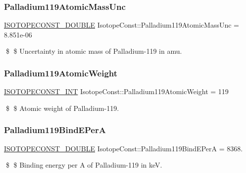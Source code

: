 \subsubsection{\texorpdfstring{Palladium119\+Atomic\+Mass\+Unc}{Palladium119AtomicMassUnc}}
{\footnotesize\ttfamily \mbox{\hyperlink{group___isotope_const-_macros_ga8f45a7272ce02c0b4c65c44636ed719a}{I\+S\+O\+T\+O\+P\+E\+C\+O\+N\+S\+T\+\_\+\+D\+O\+U\+B\+LE}} Isotope\+Const\+::\+Palladium119\+Atomic\+Mass\+Unc = 8.\+851e-\/06}

\$ \$ Uncertainty in atomic mass of Palladium-\/119 in amu. \mbox{\label{group___isotope_const-_palladium-_pd119_ga71f405cf04deb17b35e259ecd640103e}} 
\subsubsection{\texorpdfstring{Palladium119\+Atomic\+Weight}{Palladium119AtomicWeight}}
{\footnotesize\ttfamily \mbox{\hyperlink{group___isotope_const-_macros_ga5f18360b3e99483a35c32d789e62621c}{I\+S\+O\+T\+O\+P\+E\+C\+O\+N\+S\+T\+\_\+\+I\+NT}} Isotope\+Const\+::\+Palladium119\+Atomic\+Weight = 119}

\$ \$ Atomic weight of Palladium-\/119. \mbox{\label{group___isotope_const-_palladium-_pd119_ga2b0a8fd5544eb2a34c2f66d72585ea8b}} 
\subsubsection{\texorpdfstring{Palladium119\+Bind\+E\+PerA}{Palladium119BindEPerA}}
{\footnotesize\ttfamily \mbox{\hyperlink{group___isotope_const-_macros_ga8f45a7272ce02c0b4c65c44636ed719a}{I\+S\+O\+T\+O\+P\+E\+C\+O\+N\+S\+T\+\_\+\+D\+O\+U\+B\+LE}} Isotope\+Const\+::\+Palladium119\+Bind\+E\+PerA = 8368.}

\$ \$ Binding energy per A of Palladium-\/119 in keV. \mbox{\label{group___isotope_const-_palladium-_pd119_ga2e66219ecc596da0a89563719445c87e}} 
